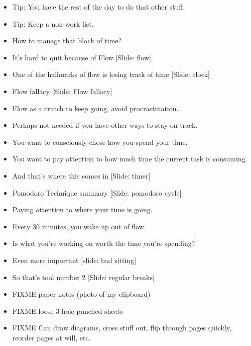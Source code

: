 \documentclass[12pt]{article}
\begin{document}
{\begin{itemize}
\item Tip:  You have the rest of the day to do that other stuff.

\item Tip:  Keep a non-work list.

\item How to manage that block of time?

\item It's hard to quit because of Flow [Slide: flow]

\item One of the hallmarks of flow is losing track of time [Slide: clock]

\item Flow fallacy [Slide: Flow fallacy]

\item Flow as a crutch to keep going, avoid procrastination.

\item Perhaps not needed if you have other ways to stay on track.

\item You want to consciously chose how you spend your time.

\item You want to pay attention to how much time the current task is consuming.

\item And that's where this comes in [Slide:  timer]

\item Pomodoro Technique summary [Slide: pomodoro cycle]

\item Paying attention to where your time is going.

\item Every 30 minutes, you wake up out of flow.

\item Is what you're working on worth the time you're spending?

\item Even more important [slide:  bad sitting]

\item So that's tool number 2 [Slide:  regular breaks]


\item FIXME  paper notes (photo of my clipboard)

\item FIXME  loose 3-hole-punched sheets

\item FIXME  Can draw diagrams, cross stuff out, flip through pages quickly, reorder pages at will, etc.


\end{itemize}}
\end{document}
